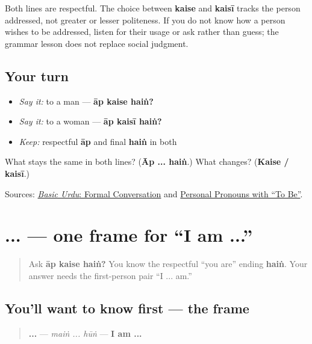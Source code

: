 \begin{grammarlens}[title={Grammar Lens: respect does not erase agreement}]
Both lines are respectful. The choice between \textbf{kaise} and \textbf{kaisī} tracks the person addressed, not greater or lesser politeness. If you do not know how a person wishes to be addressed, listen for their usage or ask rather than guess; the grammar lesson does not replace social judgment.
\end{grammarlens}

\subsection*{Your turn}
\begin{itemize}
\raggedright
  \item \emph{Say it:} to a man — \textbf{āp kaise haiṅ?}
  \item \emph{Say it:} to a woman — \textbf{āp kaisī haiṅ?}
  \item \emph{Keep:} respectful \textbf{āp} and final \textbf{haiṅ} in both
\end{itemize}

\begin{tcolorbox}[breakable,colback=teal!4,colframe=teal!35!black,title={Before you move on}]
What stays the same in both lines? (\textbf{Āp ... haiṅ}.) What changes? (\textbf{Kaise / kaisī}.)

Sources: \href{https://openbooks.lib.msu.edu/urdu/chapter/2-4/}{\emph{Basic Urdu}: Formal Conversation} and \href{https://openbooks.lib.msu.edu/urdu/chapter/2-7/}{Personal Pronouns with “To Be”}.
\end{tcolorbox}
\section[\texorpdfstring{\ur{میں} ... \ur{ہوں} (maiṅ ... hūṅ)}{میں ... ہوں (maiṅ ... hūṅ)}]{ ...  — one frame for “I am ...”}

\label{lesson:UR-C04-main-hun}



\begin{quote}
Ask \textbf{āp kaise haiṅ?} You know the respectful “you are” ending \textbf{haiṅ}. Your answer needs the first-person pair “I ... am.”
\end{quote}

\subsection*{You'll want to know first — the frame}
\begin{quote}
\textbf{ ... } — \emph{maiṅ ... hūṅ} — \textbf{I am ...}
\end{quote}

